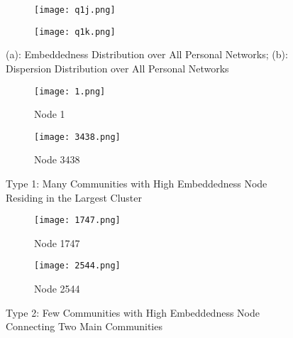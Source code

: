 \begin{figure}[h!]
	\centering
	\begin{subfigure}{.5\textwidth}
		\centering
		\texttt{[image: q1j.png]}
		\caption{}		
		\label{fig:j}
	\end{subfigure}%
	\begin{subfigure}{.5\textwidth}
		\centering
		\texttt{[image: q1k.png]}
		\caption{}	
		\label{fig:k}
	\end{subfigure}
	\caption{(a): Embeddedness Distribution over All Personal Networks; (b): Dispersion Distribution over All Personal Networks}
\end{figure}

\begin{figure}[h!]
	\centering
	\begin{subfigure}{.5\textwidth}
		\centering
		\texttt{[image: 1.png]}
		\caption{Node 1}		
	\end{subfigure}%
	\begin{subfigure}{.5\textwidth}
		\centering
		\texttt{[image: 3438.png]}
		\caption{Node 3438}	
	\end{subfigure}
	\caption{Type 1: Many Communities with High Embeddedness Node Residing in the Largest Cluster}
	\label{fig:type1}
\end{figure}

\begin{figure}[h!]
	\centering
	\begin{subfigure}{.5\textwidth}
		\centering
		\texttt{[image: 1747.png]}
		\caption{Node 1747}		
	\end{subfigure}%
	\begin{subfigure}{.5\textwidth}
		\centering
		\texttt{[image: 2544.png]}
		\caption{Node 2544}	
	\end{subfigure}
	\caption{Type 2: Few Communities with High Embeddedness Node Connecting Two Main Communities}
	\label{fig:type2}
\end{figure}
\newpage